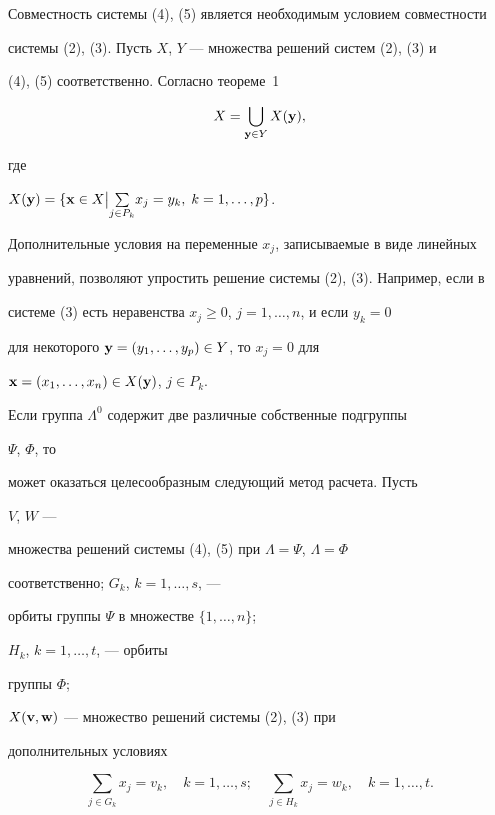 Совместность системы (4), (5) является необходимым условием совместности


системы (2), (3). Пусть $X$, $Y$ --- множества решений систем (2), (3) и


(4), (5) соответственно. Согласно теореме~1


$$


X=\bigcup_{\bold y\in Y}X(\bold y),


$$


где


$X(\bold y)=\{\bold x\in X\bigl|\sum\limits_{j\in P_k}\bigr.x_j=y_k,


\;k=1,\dotsc,p\}$.





Дополнительные условия на переменные $x_j$, записываемые в виде линейных


уравнений, позволяют упростить решение системы (2), (3). Например, если в


системе (3) есть неравенства $x_j\ge 0$, $j=1,\dotsc,n$, и если $y_k=0$


для некоторого $\bold y=(y_1,\dotsc,y_p)\in Y$, то $x_j=0$ для


$\bold x=(x_1,\dotsc,x_n)\in X(\bold y)$, $j\in P_k$.





Если группа $\Lambda^0$ содержит две различные собственные подгруппы


$\Psi$, $\Phi$, то


может оказаться целесообразным следующий метод расчета. Пусть


$V$, $W$ ---


множества решений системы (4), (5) при $\Lambda=\Psi$, $\Lambda=\Phi$


соответственно; $G_k$, $k=1,\dotsc,s$, ---


орбиты группы $\Psi$ в множестве $\{1,\dotsc,n\}$;


$H_k$, $k=1,\dotsc,t$, --- орбиты


группы $\Phi$;


$X(\bold v,\bold w)$ --- множество решений системы (2), (3) при


дополнительных условиях


\begin{equation}


\sum_{j\in G_k}x_j=v_k,\quad k=1,\dotsc,s;\quad


\sum_{j\in H_k}x_j=w_k,\quad k=1,\dotsc,t.


\end{equation}


